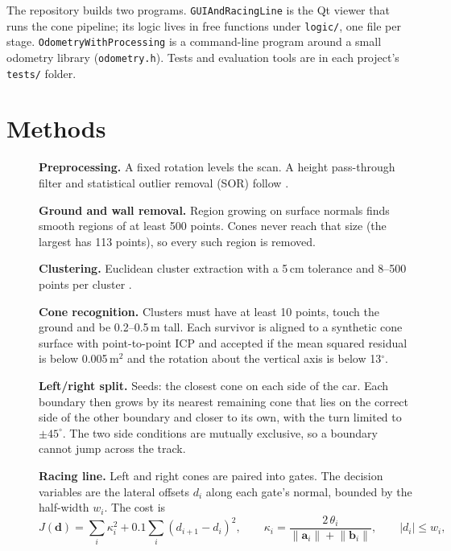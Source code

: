 \documentclass[10pt,a4paper]{scrartcl}
\renewcommand{\emph}[1]{\textcolor{accent}{#1}}
\newcommand{\file}[1]{\texttt{\small #1}}
\newcommand{\RuleSection}[1]{%
    \section{#1}%
    \vspace{0.2em}{\color{accent!35}\hrule height 0.4pt}\vspace{0.3em}%
  }
\begin{document}
  The repository builds two programs. \file{GUIAndRacingLine} is the Qt viewer that runs the
  cone pipeline; its logic lives in free functions under \file{logic/}, one file per stage.
  \file{OdometryWithProcessing} is a command-line program around a small odometry library
  (\file{odometry.h}). Tests and evaluation tools are in each project's \file{tests/} folder.

  \RuleSection{Methods}
  \label{sec:methods}

  \begin{description}
    \item[] \textbf{Preprocessing.} A fixed rotation levels the scan. A height pass-through
      filter and statistical outlier removal (SOR) follow \citep{rusu2008towards}.
    \item[] \textbf{Ground and wall removal.} Region growing on surface normals
      \citep{rabbani2006segmentation} finds smooth regions of at least 500 points. Cones never
      reach that size (the largest has 113 points), so every such region is removed.
    \item[] \textbf{Clustering.} Euclidean cluster extraction with a 5\,cm tolerance and 8--500
      points per cluster \citep{rusu2009thesis}.
    \item[] \textbf{Cone recognition.} Clusters must have at least 10 points, touch the ground and
      be 0.2--0.5\,m tall. Each survivor is aligned to a synthetic cone surface with
      point-to-point ICP \citep{besl1992icp} and accepted if the mean squared residual is below
      0.005\,m$^2$ and the rotation about the vertical axis is below 13$^\circ$.
    \item[] \textbf{Left/right split.} Seeds: the closest cone on each side of the car. Each
      boundary then grows by its nearest remaining cone that lies on the correct side of the
      \emph{other} boundary and closer to its own, with the turn limited to $\pm45^\circ$. The
      two side conditions are mutually exclusive, so a boundary cannot jump across the track.
    \item[] \textbf{Racing line.} Left and right cones are paired into gates. The decision
      variables are the lateral offsets $d_i$ along each gate's normal, bounded by the half-width
      $w_i$. The cost is
      \begin{equation}
        J(\bm d)=\sum_i \kappa_i^2+0.1\sum_i (d_{i+1}-d_i)^2,\qquad
        \kappa_i=\frac{2\,\theta_i}{\lVert\bm a_i\rVert+\lVert\bm b_i\rVert},\qquad |d_i|\le w_i ,

\end{equation}
\end{description}
\end{document}
